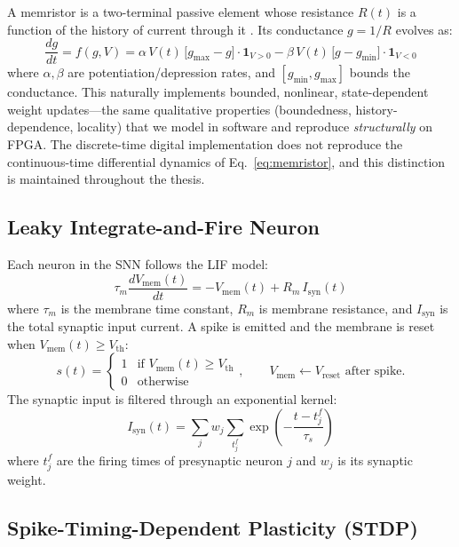\documentclass[11pt,a4paper]{article}
\newcommand{\vth}{V_{\mathrm{th}}}
\newcommand{\vmem}{V_{\mathrm{mem}}}
\begin{document}
A memristor is a two-terminal passive element whose resistance $R(t)$ is a function of
the history of current through it \cite{strukov2008}. Its conductance $g = 1/R$ evolves
as:
\begin{equation}
  \frac{dg}{dt} = f(g, V) = \alpha\, V(t)\,\bigl[g_{\max} - g\bigr] \cdot \mathbf{1}_{V>0}
                           - \beta\, V(t)\,\bigl[g - g_{\min}\bigr] \cdot \mathbf{1}_{V<0}
  \label{eq:memristor}
\end{equation}
where $\alpha,\beta$ are potentiation/depression rates, and $[g_{\min}, g_{\max}]$
bounds the conductance. This naturally implements bounded, nonlinear, state-dependent
weight updates---the same qualitative properties (boundedness, history-dependence,
locality) that we model in software and reproduce \emph{structurally} on FPGA. The
discrete-time digital implementation does not reproduce the continuous-time
differential dynamics of Eq.~\eqref{eq:memristor}, and this distinction is maintained
throughout the thesis.

\subsection{Leaky Integrate-and-Fire Neuron}

Each neuron in the SNN follows the LIF model:
\begin{equation}
  \tau_m \frac{d\vmem(t)}{dt} = -\vmem(t) + R_m\,I_{\mathrm{syn}}(t)
  \label{eq:lif}
\end{equation}
where $\tau_m$ is the membrane time constant, $R_m$ is membrane resistance, and
$I_{\mathrm{syn}}$ is the total synaptic input current. A spike is emitted and the
membrane is reset when $\vmem(t) \geq \vth$:
\begin{equation}
  s(t) = \begin{cases} 1 & \text{if } \vmem(t) \geq \vth \\ 0 & \text{otherwise} \end{cases},
  \qquad \vmem \leftarrow V_{\mathrm{reset}} \text{ after spike.}
  \label{eq:spike}
\end{equation}
The synaptic input is filtered through an exponential kernel:
\begin{equation}
  I_{\mathrm{syn}}(t) = \sum_j w_j \sum_{t_j^f} \exp\!\left(-\frac{t - t_j^f}{\tau_s}\right)
  \label{eq:syn}
\end{equation}
where $t_j^f$ are the firing times of presynaptic neuron $j$ and $w_j$ is its synaptic
weight.

\subsection{Spike-Timing-Dependent Plasticity (STDP)}
\end{document}
